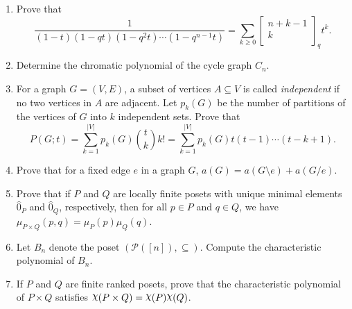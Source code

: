 \documentclass[11pt]{article}
\theoremstyle{definition}
\newcommand{\qbinom}[2]{
  \displaystyle \left[\begin{matrix}#1  \\#2  \\ \end{matrix}\right]}
\DeclareRobustCommand{\rchi}{{\mathpalette\irchi\relax}}
\newcommand{\irchi}[2]{\raisebox{\depth}{$#1\chi$}}
\begin{document}
\begin{enumerate}
\begin{enumerate}
\item Prove that
\[
\frac{1}{(1-t)(1-qt)(1-q^2t)\cdots (1-q^{n-1}t)}=\sum_{k\geq 0}\qbinom{n+k-1}{k}_qt^k.
\]

\item Determine the chromatic polynomial of the cycle graph $C_n$.

\item For a graph $G=(V,E)$, a subset of vertices $A\subseteq V$ is called \emph{independent} if no two vertices in $A$ are adjacent. Let $p_k(G)$ be the number of partitions of the vertices of $G$ into $k$ independent sets. Prove that
\[
P(G;t)=\sum_{k=1}^{|V|}p_k(G)\binom{t}{k}k!=\sum_{k=1}^{|V|}p_k(G)t(t-1)\cdots (t-k+1).
\]

\item Prove that for a fixed edge $e$ in a graph $G$, $a(G)=a(G\setminus e)+a(G/e)$.

\item Prove that if $P$ and $Q$ are locally finite posets with unique minimal elements $\hat{0}_P$ and $\hat{0}_Q$, respectively, then for all $p\in P$ and $q\in Q$, we have $\mu_{P\times Q}(p,q)=\mu_P(p)\mu_Q(q)$.

\item Let $B_n$ denote the poset $(\mathcal{P}([n]),\subseteq)$.  Compute the characteristic polynomial of $B_n$.

\item If $P$ and $Q$ are finite ranked posets, prove that the characteristic polynomial of $P\times Q$ satisfies $\rchi(P\times Q)=\rchi(P)\rchi(Q)$.

\end{enumerate}

\end{enumerate}
\end{document}
